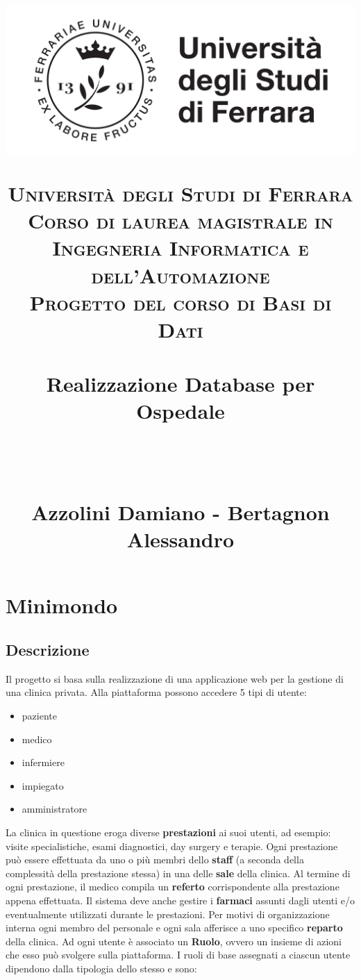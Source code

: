 \documentclass[paper=a4, fontsize=11pt,x11names]{report}
\title{
		\begin{center}
		\includegraphics[scale=0.20]{newUnife.png}
		\end{center}
		\vspace{5mm} 	 
		\usefont{OT1}{bch}{b}{n}
		\normalfont \normalsize \textsc{Universit\`a degli Studi di Ferrara \\ Corso di laurea magistrale in Ingegneria Informatica e dell'Automazione
			\\ Progetto del corso di Basi di Dati} \\ [25pt]
		\horrule{0.5pt} \\[0.4cm]
		\huge Realizzazione Database per Ospedale \date{}\\%
		\horrule{0.5pt} \\[0.4cm]
		\large Azzolini Damiano - Bertagnon Alessandro \\ [0.4cm]
}
\begin{document}
\maketitle

\newpage

\tableofcontents
\thispagestyle{empty}



\newpage





\chapter{Minimondo}
\section{Descrizione}
Il progetto si basa sulla realizzazione di una applicazione web per la gestione di una clinica privata. Alla piattaforma possono accedere 5 tipi di utente:
\begin{itemize}
\item paziente
\item medico
\item infermiere
\item impiegato
\item amministratore
\end{itemize}  

La clinica in questione eroga diverse \textbf{prestazioni} ai suoi utenti, ad esempio: visite specialistiche, esami diagnostici, day surgery e terapie. Ogni prestazione può essere effettuata da uno o più membri dello \textbf{staff} (a seconda della complessità della prestazione stessa) in una delle \textbf{sale} della clinica. Al termine di ogni prestazione, il medico compila un \textbf{referto} corrispondente alla prestazione appena effettuata. Il sistema deve anche gestire i \textbf{farmaci} assunti dagli utenti e/o eventualmente utilizzati durante le prestazioni. Per motivi di organizzazione interna ogni membro del personale e ogni sala afferisce a uno specifico \textbf{reparto} della clinica. Ad ogni utente è associato un \textbf{Ruolo}, ovvero un insieme di azioni che esso può svolgere sulla piattaforma. I ruoli di base assegnati a ciascun utente dipendono dalla tipologia dello stesso e sono:\\
\end{document}
